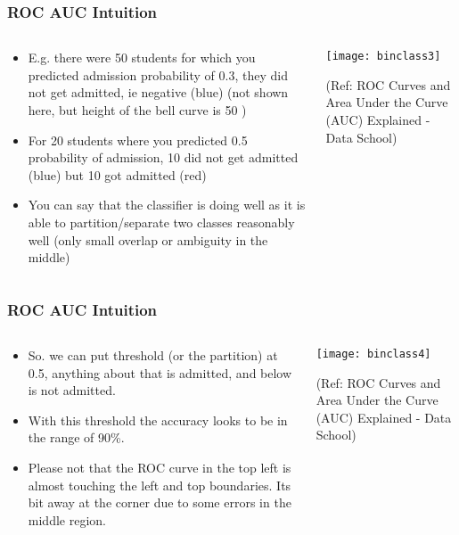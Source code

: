 \begin{frame}[fragile]\frametitle{ROC AUC Intuition}

\begin{columns}
\begin{column}[T]{0.5\linewidth}
\begin{itemize}
\item E.g. there were 50 students for which you predicted admission probability of 0.3, they did not get admitted, ie negative (blue) (not shown here, but height of the bell curve is 50 )
\item For 20 students where you predicted 0.5 probability of admission, 10 did not get admitted (blue) but 10 got admitted (red)
\item You can say that the classifier is doing well as it is able to partition/separate two classes reasonably well (only small overlap or ambiguity in the middle)
\end{itemize}
\end{column}
\begin{column}[T]{0.5\linewidth}

\begin{center}
\texttt{[image: binclass3]}
\end{center}

\tiny{(Ref: ROC Curves and Area Under the Curve (AUC) Explained - Data School)}
\end{column}

\end{columns}
\end{frame}

\begin{frame}[fragile]\frametitle{ROC AUC Intuition}

\begin{columns}
\begin{column}[T]{0.5\linewidth}
\begin{itemize}
\item So. we can put threshold (or the partition) at 0.5, anything about that is admitted, and below is not admitted.
\item With this threshold the accuracy looks to be in the range of 90\%.
\item Please not that the ROC curve in the top left is almost touching the left and top boundaries. Its bit away at the corner due to some errors in the middle region.
\end{itemize}
\end{column}
\begin{column}[T]{0.5\linewidth}

\begin{center}
\texttt{[image: binclass4]}
\end{center}

\tiny{(Ref: ROC Curves and Area Under the Curve (AUC) Explained - Data School)}
\end{column}

\end{columns}
\end{frame}

